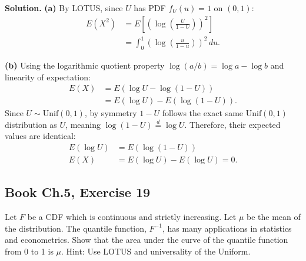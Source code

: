 \documentclass[11pt,a4paper]{article}
\begin{document}
\noindent \textbf{Solution.} \textbf{(a)} By LOTUS, since $U$ has PDF $f_U(u) = 1$ on $(0, 1)$:
\begin{align*}
E(X^2) &= E\left[ \left( \log\left(\frac{U}{1 - U}\right) \right)^2 \right] \\
&= \int_{0}^{1} \left( \log\left(\frac{u}{1 - u}\right) \right)^2 \, du.
\end{align*}

\vspace{4pt}
\noindent \textbf{(b)} Using the logarithmic quotient property $\log(a/b) = \log a - \log b$ and linearity of expectation:
\begin{align*}
E(X) &= E\left( \log U - \log(1 - U) \right) \\
&= E(\log U) - E(\log(1 - U)).
\end{align*}
Since $U \sim \text{Unif}(0, 1)$, by symmetry $1 - U$ follows the exact same $\text{Unif}(0, 1)$ distribution as $U$, meaning $\log(1 - U) \stackrel{d}{=} \log U$. Therefore, their expected values are identical:
\begin{align*}
E(\log U) &= E(\log(1 - U)) \\
E(X) &= E(\log U) - E(\log U) = 0.
\end{align*}

\vspace{10pt}
\subsection{Book Ch.5, Exercise 19}
\begin{tcolorbox}[title={Book Ch.5, Exercise 19}]
Let $F$ be a CDF which is continuous and strictly increasing. Let $\mu$ be the mean of the distribution. The quantile function, $F^{-1}$, has many applications in statistics and econometrics. Show that the area under the curve of the quantile function from 0 to 1 is $\mu$.
Hint: Use LOTUS and universality of the Uniform.
\end{tcolorbox}
\end{document}
